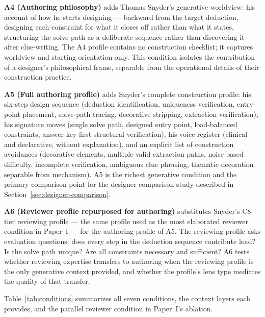 \textbf{A4 (Authoring philosophy)} adds Thomas Snyder's generative worldview: his account of how he starts designing --- backward from the target deduction, designing each constraint for what it closes off rather than what it states, structuring the solve path as a deliberate sequence rather than discovering it after clue-writing. The A4 profile contains no construction checklist; it captures worldview and starting orientation only. This condition isolates the contribution of a designer's philosophical frame, separable from the operational details of their construction practice.

\textbf{A5 (Full authoring profile)} adds Snyder's complete construction profile: his six-step design sequence (deduction identification, uniqueness verification, entry-point placement, solve-path tracing, decorative stripping, extraction verification), his signature moves (single solve path, designed entry point, load-balanced constraints, answer-key-first structural verification), his voice register (clinical and declarative, without explanation), and an explicit list of construction avoidances (decorative elements, multiple valid extraction paths, noise-based difficulty, incomplete verification, ambiguous clue phrasing, thematic decoration separable from mechanism). A5 is the richest generative condition and the primary comparison point for the designer comparison study described in Section~\ref{sec:designer-comparison}.

\textbf{A6 (Reviewer profile repurposed for authoring)} substitutes Snyder's C8-tier reviewing profile --- the same profile used as the most elaborated reviewer condition in Paper~I --- for the authoring profile of A5. The reviewing profile asks evaluation questions: does every step in the deduction sequence contribute load? Is the solve path unique? Are all constraints necessary and sufficient? A6 tests whether reviewing expertise transfers to authoring when the reviewing profile is the only generative context provided, and whether the profile's lens type mediates the quality of that transfer.

Table~\ref{tab:conditions} summarizes all seven conditions, the context layers each provides, and the parallel reviewer condition in Paper~I's ablation.

